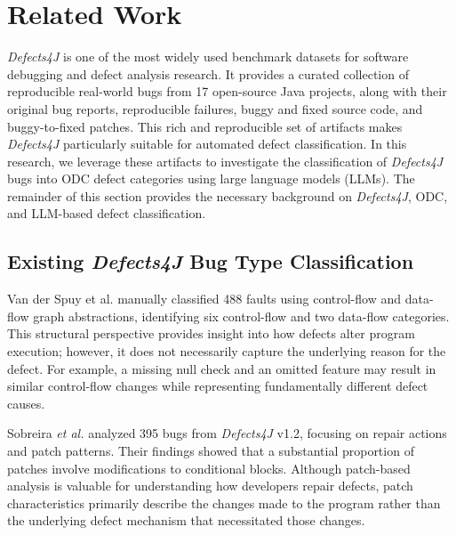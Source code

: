 \section{Related Work}
\label{sec:related}


\textit{Defects4J} \citep{just2014defects4j} is one of the most widely used benchmark datasets for software debugging and defect analysis research. It provides a curated collection of reproducible real-world bugs from 17 open-source Java projects, along with their original bug reports, reproducible failures, buggy and fixed source code, and buggy-to-fixed patches. This rich and reproducible set of artifacts makes \textit{Defects4J} particularly suitable for automated defect classification. In this research, we leverage these artifacts to investigate the classification of \textit{Defects4J} bugs into ODC defect categories using large language models (LLMs). The remainder of this section provides the necessary background on \textit{Defects4J}, ODC, and LLM-based defect classification.

\subsection{Existing \textit{Defects4J} Bug Type Classification}


Van der Spuy et al. \citep{vanderspuy2025anatomy} manually classified 488 faults using control-flow and data-flow graph abstractions, identifying six control-flow and two data-flow categories. This structural perspective provides insight into how defects alter program execution; however, it does not necessarily capture the underlying reason for the defect. For example, a missing null check and an omitted feature may result in similar control-flow changes while representing fundamentally different defect causes.

Sobreira \textit{et al.} \citep{sobreira2018dissection} analyzed 395 bugs from \textit{Defects4J} v1.2, focusing on repair actions and patch patterns. Their findings showed that a substantial proportion of patches involve modifications to conditional blocks. Although patch-based analysis is valuable for understanding how developers repair defects, patch characteristics primarily describe the changes made to the program rather than the underlying defect mechanism that necessitated those changes.

